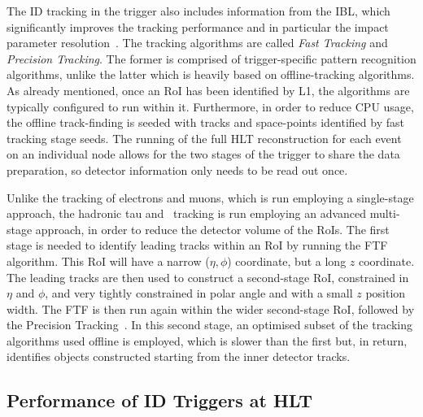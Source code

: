 				The ID tracking in the trigger also includes information from the IBL, which significantly improves the tracking performance and in particular the impact parameter resolution~\cite{IBLTDR}. The tracking algorithms are called \emph{Fast Tracking} and \emph{Precision Tracking}. The former is comprised of trigger-specific pattern recognition algorithms, unlike the latter which is heavily based on offline-tracking algorithms.
				As already mentioned, once an \ac{RoI} has been identified by \ac{L1}, the algorithms are typically configured to run within it. Furthermore, in order to reduce \ac{CPU} usage, the offline track-finding is seeded with tracks and space-points identified by fast tracking stage seeds. The running of the full \ac{HLT} reconstruction for each event on an individual node allows for the two stages of the trigger to share the data preparation, so detector information only needs to be read out once. 

				Unlike the tracking of electrons and muons, which is run employing a single-stage approach, the hadronic tau and \bj\ tracking is run employing an advanced multi-stage approach, in order to reduce the detector volume of the \acp{RoI}. The first stage is needed to identify leading tracks within an \ac{RoI} by running the \ac{FTF} algorithm. This \ac{RoI} will have a narrow ($\eta, \phi$) coordinate, but a long $z$ coordinate. The leading tracks are then used to construct a second-stage \ac{RoI}, constrained in $\eta$ and $\phi$, and very tightly constrained in polar angle and with a small $z$ position width. The \ac{FTF} is then run again within the wider second-stage \ac{RoI}, followed by the Precision Tracking~\cite{ATLASTrigger2015, Miano:2016oty}. In this second stage, an optimised subset of the tracking algorithms used offline is employed, which is slower than the first but, in return, identifies objects constructed starting from the inner detector tracks.



			\subsection{Performance of ID Triggers at HLT}
			\label{sec:Trig_perf_HLT}

